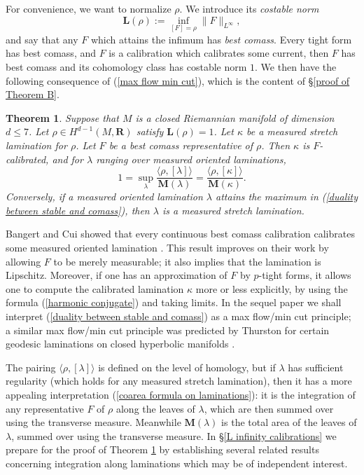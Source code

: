 \documentclass[reqno,11pt]{amsart}
\newcommand{\RR}{\mathbf{R}}
\newcommand{\Mass}{\mathbf M}
\newcommand{\Comass}{\mathbf L}
\newcommand{\dfn}[1]{\emph{#1}\index{#1}}
\newtheorem{mainthm}{Theorem}
\theoremstyle{definition}
\numberwithin{equation}{section}
\begin{document}
For convenience, we want to normalize $\rho$. 
We introduce its \dfn{costable norm}
$$\Comass(\rho) := \inf_{[F] = \rho} \|F\|_{L^\infty},$$
and say that any $F$ which attains the infimum has \dfn{best comass}.
Every tight form has best comass, and $F$ is a calibration which calibrates some current, then $F$ has best comass and its cohomology class has costable norm $1$.
We then have the following consequence of (\ref{max flow min cut}), which is the content of \S\ref{proof of Theorem B}.

\begin{mainthm}\label{lams are calibrated}
Suppose that $M$ is a closed Riemannian manifold of dimension $d \leq 7$.
Let $\rho \in H^{d - 1}(M, \RR)$ satisfy $\Comass(\rho) = 1$.
Let $\kappa$ be a measured stretch lamination for $\rho$.
Let $F$ be a best comass representative of $\rho$.
Then $\kappa$ is $F$-calibrated, and for $\lambda$ ranging over measured oriented laminations,
\begin{equation}\label{duality between stable and comass}
1 = \sup_\lambda \frac{\langle \rho, [\lambda]\rangle}{\Mass(\lambda)} = \frac{\langle \rho, [\kappa]\rangle}{\Mass(\kappa)}.
\end{equation}
Conversely, if a measured oriented lamination $\lambda$ attains the maximum in (\ref{duality between stable and comass}), then $\lambda$ is a measured stretch lamination.
\end{mainthm}

Bangert and Cui showed that every continuous best comass calibration calibrates some measured oriented lamination \cite{bangert_cui_2017}.
This result improves on their work by allowing $F$ to be merely measurable; it also implies that the lamination is Lipschitz.
Moreover, if one has an approximation of $F$ by $p$-tight forms, it allows one to compute the calibrated lamination $\kappa$ more or less explicitly, by using the formula (\ref{harmonic conjugate}) and taking limits.
In the sequel paper \cite{BackusBest2} we shall interpret (\ref{duality between stable and comass}) as a max flow/min cut principle; a similar max flow/min cut principle was predicted by Thurston for certain geodesic laminations on closed hyperbolic manifolds \cite{Thurston98}.

The pairing $\langle \rho, [\lambda]\rangle$ is defined on the level of homology, but if $\lambda$ has sufficient regularity (which holds for any measured stretch lamination), then it has a more appealing interpretation (\ref{coarea formula on laminations}): it is the integration of any representative $F$ of $\rho$ along the leaves of $\lambda$, which are then summed over using the transverse measure.
Meanwhile $\Mass(\lambda)$ is the total area of the leaves of $\lambda$, summed over using the transverse measure.
In \S\ref{L infinity calibrations} we prepare for the proof of Theorem \ref{lams are calibrated} by establishing several related results concerning integration along laminations which may be of independent interest.
\end{document}
